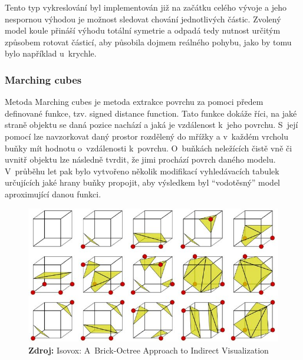 Tento typ vykreslování byl implementován již na začátku celého vývoje a jeho nespornou výhodou je možnost sledovat chování jednotlivých částic. Zvolený model koule přináší výhodu totální symetrie a odpadá tedy nutnost určitým způsobem rotovat částicí, aby působila dojmem reálného pohybu, jako by tomu bylo například u~krychle.

\subsubsection{Marching cubes}
Metoda Marching cubes \cite{marchingCubes} je metoda extrakce povrchu za pomoci předem definované funkce, tzv. signed distance function. Tato funkce dokáže říci, na jaké straně objektu se daná pozice nachází a jaká je vzdálenost k~jeho povrchu. S~její pomocí lze navzorkovat daný prostor rozdělený do mřížky a v~každém vrcholu buňky mít hodnotu o~vzdálenosti k~povrchu. O~buňkách neležících čistě vně či uvnitř objektu lze následně tvrdit, že jimi prochází povrch daného modelu. V~průběhu let pak bylo vytvořeno několik modifikací vyhledávacích tabulek určujících jaké hrany buňky propojit, aby výsledkem byl \enquote{vodotěsný} model aproximující danou funkci.

\begin{figure}[hbt]
	\centering
	\captionsetup{justification=centering}
	\includegraphics[scale=0.4]{obrazky-figures/Look-up-table-for-the-Marching-Cubes-algorithm-13_W640.jpg}
	\textbf{Zdroj: } Isovox: A~Brick-Octree Approach to Indirect Visualization \cite{isovox}
	\label{fig:EvapFlow}
\end{figure}

